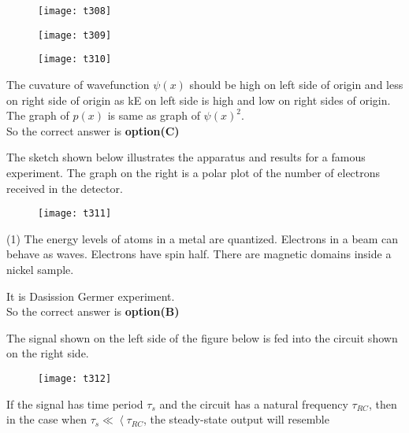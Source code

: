 \begin{questions}
\begin{tasks}
\begin{figure}[H]
		\centering
		\texttt{[image: t308]}
	\end{figure}
	\task[\textbf{C.}] \begin{figure}[H]
		\centering
		\texttt{[image: t309]}
	\end{figure}
	\task[\textbf{D.}] \begin{figure}[H]
		\centering
		\texttt{[image: t310]}
	\end{figure}
\end{tasks}
\begin{answer}
	The cuvature of wavefunction $\psi(x)$ should be high on left side of origin and less on right side of origin as kE on left side is high and low on right sides of origin. The graph of $p(x)$ is same as graph of $\psi(x)^{2}$.\\
	So the correct answer is \textbf{option(C)}
\end{answer}
\begin{minipage}{\textwidth}
	\question The sketch shown below illustrates the apparatus and results for a famous experiment. The graph on the right is a polar plot of the number of electrons received in the detector.
\end{minipage}
\begin{figure}[H]
	\centering
	\texttt{[image: t311]}
\end{figure}
\begin{tasks}(1)
	\task[\textbf{A.}]   The energy levels of atoms in a metal are quantized.
	\task[\textbf{B.}] Electrons in a beam can behave as waves.
	\task[\textbf{C.}] Electrons have spin half.
	\task[\textbf{D.}] There are magnetic domains inside a nickel sample.
\end{tasks}
\begin{answer}
	It is Dasission Germer experiment.\\
	So the correct answer is \textbf{option(B)}
\end{answer}
\begin{minipage}{\textwidth}
	\question The signal shown on the left side of the figure below is fed into the circuit shown on the right side.\\
	\begin{figure}[H]
		\centering
		\texttt{[image: t312]}
	\end{figure}
	If the signal has time period $\tau_{s}$ and the circuit has a natural frequency $\tau_{R C}$, then in the case when $\tau_{s} \ll\left\langle\tau_{R C}\right.$, the steady-state output will resemble

\end{minipage}
\end{questions}
